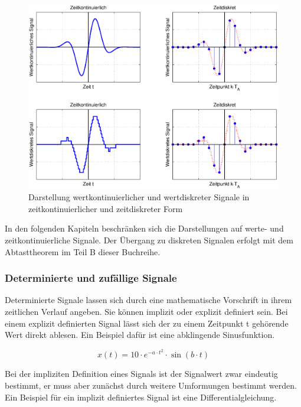 \clearpage
\begin{figure}[H]
  \includegraphics[width=1.0\textwidth]{Kapitel1/Bilder/image1.eps}
  \caption{Darstellung wertkontinuierlicher und wertdiskreter Signale in zeitkontinuierlicher und zeitdiskreter Form}
  \label{fig:DiskreKontinuerlich}
\end{figure}

\noindent In den folgenden Kapiteln beschränken sich die Darstellungen auf werte- und zeitkontinuierliche Signale. Der Übergang zu diskreten Signalen erfolgt mit dem Abtasttheorem im Teil B dieser Buchreihe.


\subsubsection{ Determinierte und zuf\"{a}llige Signale}
Determinierte Signale lassen sich durch eine mathematische Vorschrift in ihrem zeitlichen Verlauf angeben. Sie k\"{o}nnen implizit oder explizit definiert sein. Bei einem explizit definierten Signal l\"{a}sst sich der zu einem Zeitpunkt t geh\"{o}rende Wert direkt ablesen. Ein Beispiel daf\"{u}r ist eine abklingende Sinusfunktion.

\begin{equation}\label{eq:oneone}
x(t)=10\cdot e^{\displaystyle -a\cdot t^{2}} \cdot\sin (b\cdot t)
\end{equation}

\noindent Bei der impliziten Definition eines Signals ist der Signalwert zwar eindeutig bestimmt, er muss aber zun\"{a}chst durch weitere Umformungen bestimmt werden. Ein Beispiel f\"{u}r ein implizit definiertes Signal ist eine Differentialgleichung.


